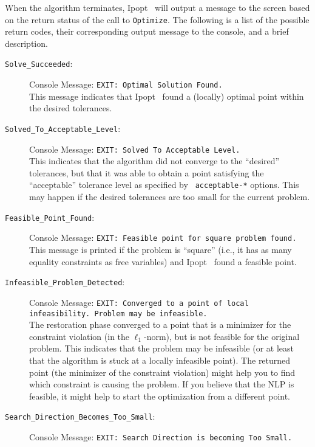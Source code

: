 \documentclass[10pt]{article}
\newcommand{\Ipopt}{{\sc Ipopt }}
\begin{document}
When the algorithm terminates, \Ipopt\ will output a message to the
screen based on the return status of the call to {\tt Optimize}. The following
is a list of the possible return codes, their corresponding output message
to the console, and a brief description.
\begin{description}
\item[{\tt Solve\_Succeeded}:] $\;$ \\
  Console Message: {\tt EXIT: Optimal Solution Found.} \\
  This message indicates that \Ipopt\ found a (locally) optimal point
  within the desired tolerances.
\item[{\tt Solved\_To\_Acceptable\_Level}:]  $\;$ \\
  Console Message: {\tt EXIT: Solved To Acceptable Level.} \\
  This indicates that the algorithm did not converge to the
  ``desired'' tolerances, but that it was able to obtain a point
  satisfying the ``acceptable'' tolerance level as specified by {\tt
    acceptable-*} options. This may happen if the desired tolerances
  are too small for the current problem.
\item[{\tt Feasible\_Point\_Found}:]  $\;$ \\
  Console Message: {\tt EXIT: Feasible point for square problem found.} \\
  This message is printed if the problem is ``square'' (i.e., it has
  as many equality constraints as free variables) and \Ipopt\ found a
  feasible point.
\item[{\tt Infeasible\_Problem\_Detected}:]  $\;$ \\
  Console Message: {\tt EXIT: Converged to a point of
    local infeasibility. Problem may be infeasible.} \\
  The restoration phase converged to a point that is a minimizer for
  the constraint violation (in the $\ell_1$-norm), but is not feasible
  for the original problem. This indicates that the problem may be
  infeasible (or at least that the algorithm is stuck at a locally
  infeasible point).  The returned point (the minimizer of the
  constraint violation) might help you to find which constraint is
  causing the problem.  If you believe that the NLP is feasible,
  it might help to start the optimization from a different point.
\item[{\tt Search\_Direction\_Becomes\_Too\_Small}:]  $\;$ \\
  Console Message: {\tt EXIT: Search Direction is becoming Too Small.} \\

\end{description}
\end{document}
